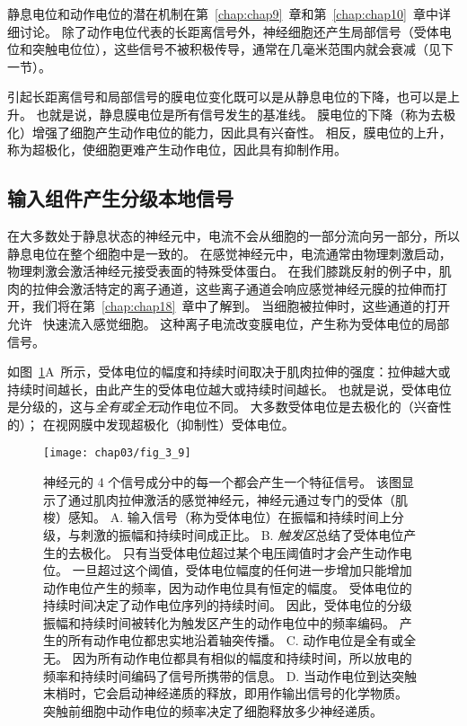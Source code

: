 静息电位和动作电位的潜在机制在第~\ref{chap:chap9}~章和第~\ref{chap:chap10}~章中详细讨论。
除了动作电位代表的长距离信号外，神经细胞还产生局部信号（受体电位和突触电位位），这些信号不被积极传导，通常在几毫米范围内就会衰减（见下一节）。


引起长距离信号和局部信号的膜电位变化既可以是从静息电位的下降，也可以是上升。
也就是说，静息膜电位是所有信号发生的基准线。 
膜电位的下降（称为去极化）增强了细胞产生动作电位的能力，因此具有兴奋性。 
相反，膜电位的上升，称为超极化，使细胞更难产生动作电位，因此具有抑制作用。


\subsection{输入组件产生分级本地信号}
在大多数处于静息状态的神经元中，电流不会从细胞的一部分流向另一部分，所以静息电位在整个细胞中是一致的。 
在感觉神经元中，电流通常由物理刺激启动，物理刺激会激活神经元接受表面的特殊受体蛋白。 
在我们膝跳反射的例子中，肌肉的拉伸会激活特定的离子通道，这些离子通道会响应感觉神经元膜的拉伸而打开，我们将在第~\ref{chap:chap18}~章中了解到。
当细胞被拉伸时，这些通道的打开允许~ 快速流入感觉细胞。
这种离子电流改变膜电位，产生称为受体电位的局部信号。


如图~\ref{fig:3_9}A~所示，受体电位的幅度和持续时间取决于肌肉拉伸的强度：拉伸越大或持续时间越长，由此产生的受体电位越大或持续时间越长。
也就是说，受体电位是分级的，这与\textit{全有或全无}动作电位不同。
大多数受体电位是去极化的（兴奋性的）；
在视网膜中发现超极化（抑制性）受体电位。


\begin{figure}[htbp]
	\centering
	\texttt{[image: chap03/fig\_3\_9]}
	\caption{神经元的 4 个信号成分中的每一个都会产生一个特征信号。
		该图显示了通过肌肉拉伸激活的感觉神经元，神经元通过专门的受体（肌梭）感知。 
		A. 输入信号（称为受体电位）在振幅和持续时间上分级，与刺激的振幅和持续时间成正比。 
		B. \textit{触发区}总结了受体电位产生的去极化。
		只有当受体电位超过某个电压阈值时才会产生动作电位。
		一旦超过这个阈值，受体电位幅度的任何进一步增加只能增加动作电位产生的频率，因为动作电位具有恒定的幅度。
		受体电位的持续时间决定了动作电位序列的持续时间。
		因此，受体电位的分级振幅和持续时间被转化为触发区产生的动作电位中的频率编码。
		产生的所有动作电位都忠实地沿着轴突传播。
		C. 动作电位是全有或全无。
		因为所有动作电位都具有相似的幅度和持续时间，所以放电的频率和持续时间编码了信号所携带的信息。
		D. 当动作电位到达突触末梢时，它会启动神经递质的释放，即用作输出信号的化学物质。
		突触前细胞中动作电位的频率决定了细胞释放多少神经递质。}
	\label{fig:3_9}
\end{figure}


